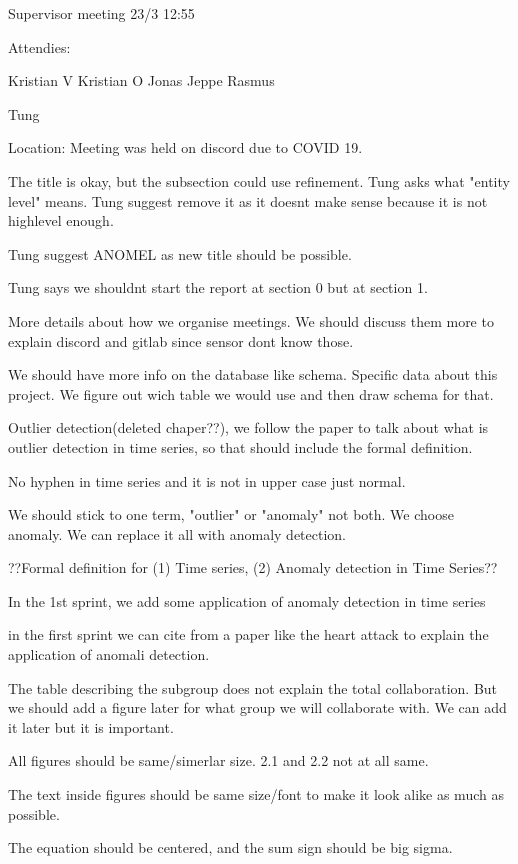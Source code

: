 Supervisor meeting 23/3 12:55

Attendies:

Kristian V
Kristian O
Jonas
Jeppe
Rasmus

Tung

Location: Meeting was held on discord due to COVID 19.

The title is okay, but the subsection could use refinement.
Tung asks what "entity level" means. Tung suggest remove it as it doesnt make sense because it is not highlevel enough.

Tung suggest ANOMEL as new title should be possible.

Tung says we shouldnt start the report at section 0 but at section 1.

More details about how we organise meetings.
We should discuss them more to explain discord and gitlab since sensor dont know those.

We should have more info on the database like schema. Specific data about this project. We figure out wich table we would use and then draw schema for that.

Outlier detection(deleted chaper??), we follow the paper to talk about what is outlier detection in time series, so that should include the formal definition.

No hyphen in time series and it is not in upper case just normal.  

We should stick to one term, "outlier" or "anomaly" not both.
We choose anomaly. We can replace it all with anomaly detection. 

??Formal definition for (1) Time series, (2) Anomaly detection in Time Series?? 

In the 1st sprint, we add some application of anomaly detection in time series

in the first sprint we can cite from a paper like the heart attack to explain the application of anomali detection.

The table describing the subgroup does not explain the total collaboration. But we should add a figure later for what group we will collaborate with. We can add it later but it is important.

All figures should be same/simerlar size. 2.1 and 2.2 not at all same.

The text inside figures should be same size/font to make it look alike as much as possible.

The equation should be centered, and the sum sign should be big sigma.


